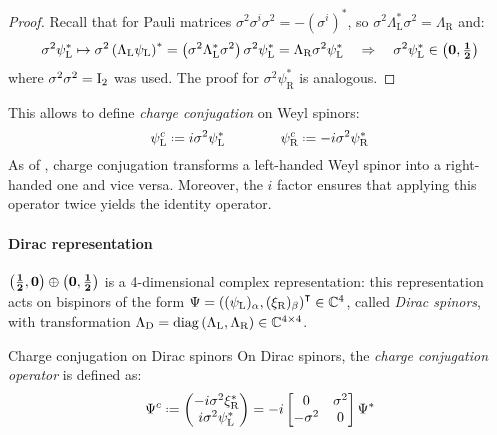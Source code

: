 \begin{proofbox}
  \begin{proof}
    Recall that for Pauli matrices $ \sigma^2 \sigma^i \sigma^2 = -(\sigma^i)^* $, so $ \sigma^2 \Lambda_\text{L}^* \sigma^2 = \Lambda_\text{R} $ and:
    \begin{equation*}
      \sigma^2 \psi_\text{L}^* \mapsto \sigma^2 \left( \Lambda_\text{L} \psi_\text{L} \right)^* = \left( \sigma^2 \Lambda_\text{L}^* \sigma^2 \right) \sigma^2 \psi_\text{L}^* = \Lambda_\text{R} \sigma^2 \psi_\text{L}^*
      \quad \Rightarrow \quad
      \sigma^2 \psi_\text{L}^* \in \mathbf{\left( 0,\tfrac{1}{2} \right)}
    \end{equation*}
    where $ \sigma^2 \sigma^2 = \mathrm{I}_2 $ was used. The proof for $ \sigma^2 \psi_\text{R}^* $ is analogous.
  \end{proof}
\end{proofbox}

This allows to define \textit{charge conjugation} on Weyl spinors:
\begin{equation}
  \psi_\text{L}^c \defeq i \sigma^2 \psi_\text{L}^*
  \qquad \qquad
  \psi_\text{R}^c \defeq -i \sigma^2 \psi_\text{R}^*
\end{equation}
As of , charge conjugation transforms a left-handed Weyl spinor into a right-handed one and vice versa. Moreover, the $ i $ factor ensures that applying this operator twice yields the identity operator.

\paragraph{Dirac representation}

$ \mathbf{\left( \frac{1}{2},0 \right)} \oplus \mathbf{\left( 0,\frac{1}{2} \right)} $ is a 4-dimensional complex representation: this representation acts on bispinors of the form $ \Psi = \left( (\psi_\text{L})_\alpha, (\xi_\text{R})_\beta \right)^\intercal \in \mathbb{C}^4 $, called \textit{Dirac spinors}, with transformation $ \Lambda_\text{D} = \operatorname{diag} \left( \Lambda_\text{L}, \Lambda_\text{R} \right) \in \mathbb{C}^{4 \times 4} $.

\begin{definition}{Charge conjugation on Dirac spinors}{}
  On Dirac spinors, the \textit{charge conjugation operator} is defined as:
  \begin{equation}
    \Psi^c \defeq
    \begin{pmatrix}
      - i \sigma^2 \xi_\text{R}^* \\
      i \sigma^2 \psi_\text{L}^*
    \end{pmatrix}
    = -i
    \begin{bmatrix}
      0 & \sigma^2 \\ -\sigma^2 & 0
    \end{bmatrix}
    \Psi^*
    \label{eq:dir-spin-charge-conj}
  \end{equation}
\end{definition}

